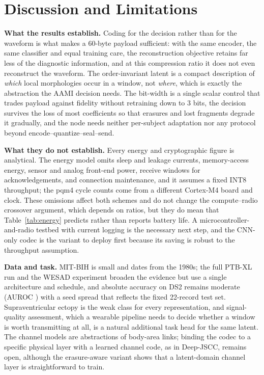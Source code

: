 \documentclass[journal]{IEEEtran}
\begin{document}
\section{Discussion and Limitations}\label{sec:discussion}
\textbf{What the results establish.} Coding for the decision rather than for the waveform is what makes a 60-byte payload sufficient: with \ifhavepe the same encoder, \fi the same classifier and equal training care, the reconstruction objective retains far less of the diagnostic information, and at this compression ratio it does not even reconstruct the waveform. The order-invariant latent is a compact description of \emph{which} local morphologies occur in a window, not \emph{where}, which is exactly the abstraction the AAMI decision needs. The bit-width is a single scalar control that trades payload against fidelity without retraining down to 3 bits, the decision survives the loss of most coefficients so that erasures and lost fragments degrade it gradually, and the node needs neither per-subject adaptation nor any protocol beyond encode--quantize--seal--send.

\textbf{What they do not establish.} Every energy and cryptographic figure is analytical. The energy model omits sleep and leakage currents, memory-access energy, sensor and analog front-end power, receive windows for acknowledgements, and connection maintenance, and it assumes a fixed INT8 throughput; the pqm4 cycle counts come from a different Cortex-M4 board and clock. These omissions affect both schemes and do not change the compute--radio crossover argument, which depends on ratios, but they do mean that Table~\ref{tab:energy} predicts rather than reports battery life. A microcontroller-and-radio testbed with current logging is the necessary next step, and the CNN-only codec is the variant to deploy first because its saving is robust to the throughput assumption.

\textbf{Data and task.} MIT-BIH is small and dates from the 1980s; the full PTB-XL run and the WESAD experiment broaden the evidence but use a single architecture and schedule, and absolute accuracy on DS2 remains moderate (AUROC \mainAUROC{}) with a seed spread that reflects the fixed 22-record test set. Supraventricular ectopy is the weak class for every representation, and signal-quality assessment, which a wearable pipeline needs to decide whether a window is worth transmitting at all, is a natural additional task head for the same latent. The channel models are abstractions of body-area links; binding the codec to a specific physical layer with a learned channel code, as in Deep-JSCC, remains open, although the erasure-aware variant shows that a latent-domain channel layer is straightforward to train.
\end{document}
